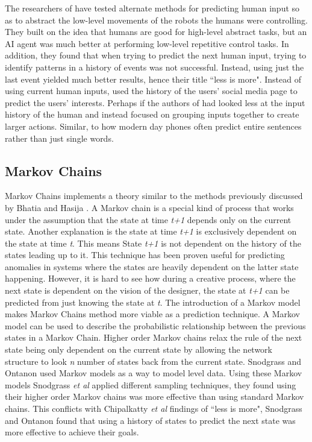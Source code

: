 \documentclass[journal]{IEEEtran}
\begin{document}
The researchers of \cite{chipalkatty2013less} have tested alternate methods for predicting human input so as to abstract the low-level movements of the robots the humans were controlling. They built on the idea that humans are good for high-level abstract tasks, but an AI agent was much better at performing low-level repetitive control tasks. In addition, they found that when trying to predict the next human input, trying to identify patterns in a history of events was not successful. Instead, using just the last event yielded much better results, hence their title ``less is more". Instead of using current human inputs, \cite{bhatia2016targeted} used the history of the users' social media page to predict the users' interests. Perhaps if the authors of \cite{chipalkatty2013less} had looked less at the input history of the human and instead focused on grouping inputs together to create larger actions. Similar, to how modern day phones often predict entire sentences rather than just single words.

\subsection{Markov Chains}
Markov Chains implements a theory similar to the methods previously discussed by Bhatia and Hasija \cite{bhatia2016targeted}. A Markov chain is a special kind of process that works under the assumption that the state at time \textit{t+1} depends only on the current state. Another explanation is the state at time \textit{t+1} is exclusively dependent on the state at time \textit{t}. This means State \textit{t+1} is not dependent on the history of the states leading up to it\cite{ye2000markov}. This technique has been proven useful for predicting anomalies in systems \cite{ju2001hybrid, gwadera2005markov, ye2000markov} where the states are heavily dependent on the latter state happening. However, it is hard to see how during a creative process, where the next state is dependent on the vision of the designer, the state at \textit{t+1} can be predicted from just knowing the state at \textit{t}. 
The introduction of a Markov model makes Markov Chains method more viable as a prediction technique. A Markov model can be used to describe the probabilistic relationship between the previous states in a Markov Chain\cite{markov1971extension}. Higher order Markov chains relax the rule of the next state being only dependent on the current state by allowing the network structure to look \textit{n} number of states back from the current state\cite{ching2008higher}. Snodgrass and Ontanon\cite{snodgrass2017learning} used Markov models as a way to model level data. Using these Markov models Snodgrass \textit{et al}\cite{snodgrass2017learning} applied different sampling techniques, they found using their higher order Markov chains was more effective than using standard Markov chains. This conflicts with Chipalkatty \textit{et al}\cite{chipalkatty2013less} findings of ``less is more", Snodgrass and Ontanon\cite{snodgrass2017learning} found that using a history of states to predict the next state was more effective to achieve their goals.
\end{document}
